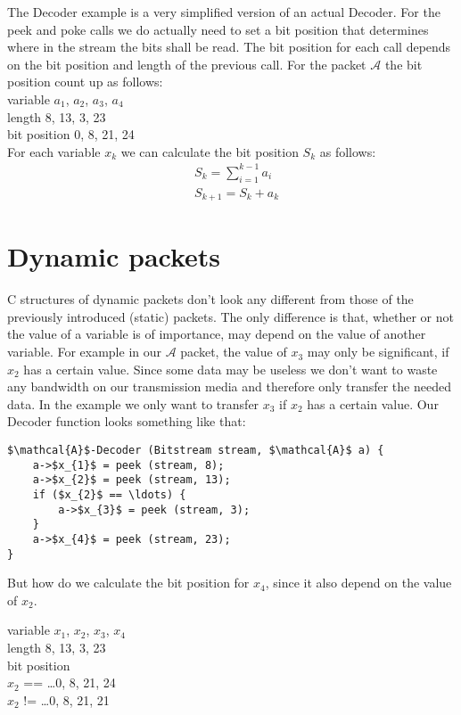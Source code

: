 \documentclass[parskip=half,paper=a4,DIV=12]{scrartcl}
\begin{document}
The Decoder example is a very simplified version of an actual Decoder.
For the peek and poke calls we do actually need to set a bit position
that determines where in the stream the bits shall be read.
The bit position for each call depends on the bit position and length of the previous call.
For the packet $\mathcal{A}$ the bit position count up as follows:\\
variable   $a_{1}$, $a_{2}$, $a_{3}$, $a_{4}$\\
length      8, 13,  3, 23\\
bit position      0,  8, 21, 24\\
For each variable $x_{k}$ we can calculate the bit position $S_{k}$ as follows:
\begin{align*}
	&S_{k} = \sum_{i=1}^{k-1} a_{i}\\
	&S_{k+1} = S_{k} + a_{k}
\end{align*}

\section{Dynamic packets}

C structures of dynamic packets don't look any different from those of the previously introduced (static) packets.
The only difference is that, whether or not the value of a variable is of importance, may depend on the value of another variable.	
For example in our $\mathcal{A}$ packet, the value of $x_{3}$ may only be significant, if $x_{2}$ has a certain value.
Since some data may be useless we don't want to waste any bandwidth on our transmission media and therefore only transfer the needed data.
In the example we only want to transfer $x_{3}$ if $x_{2}$ has a certain value.
Our Decoder function looks something like that:

\begin{lstlisting}[mathescape]
$\mathcal{A}$-Decoder (Bitstream stream, $\mathcal{A}$ a) {
	a->$x_{1}$ = peek (stream, 8);
	a->$x_{2}$ = peek (stream, 13);
	if ($x_{2}$ == \ldots) {
		a->$x_{3}$ = peek (stream, 3);
	}
	a->$x_{4}$ = peek (stream, 23);
}
\end{lstlisting}

But how do we calculate the bit position for $x_{4}$, since it also depend on the value of $x_{2}$.

variable   $x_{1}$, $x_{2}$, $x_{3}$, $x_{4}$\\
length        8, 13, 3, 23\\
bit position\\
$x_{2}$ == \ldots  0, 8, 21, 24\\
$x_{2}$ != \ldots  0, 8, 21, 21\\
\end{document}
